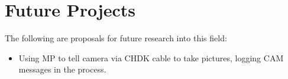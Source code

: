 \section{Future Projects}

The following are proposals for future research into this field:

\begin{itemize}
    \item Using MP to tell camera via CHDK cable to take pictures, logging CAM
        messages in the process.
\end{itemize}
